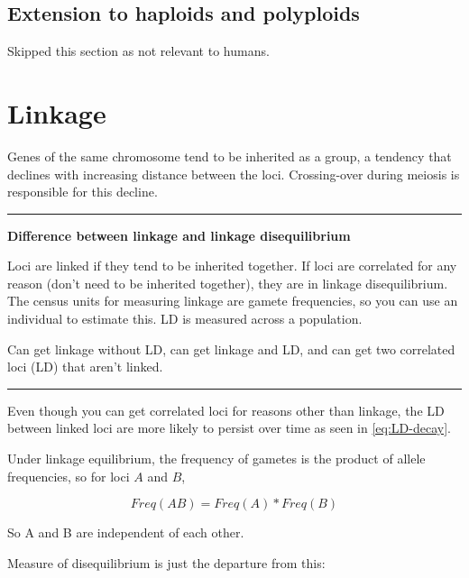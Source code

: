 \documentclass[
]{book}
\begin{document}
\hypertarget{extension-to-haploids-and-polyploids}{%
\subsection{Extension to haploids and polyploids}\label{extension-to-haploids-and-polyploids}}

Skipped this section as not relevant to humans.

\hypertarget{linkage}{%
\section{Linkage}\label{linkage}}

Genes of the same chromosome tend to be inherited as a group, a tendency that declines with increasing distance between the loci. Crossing-over during meiosis is responsible for this decline.

\begin{center}\rule{0.5\linewidth}{0.5pt}\end{center}

\textbf{Difference between linkage and linkage disequilibrium}

Loci are linked if they tend to be inherited together. If loci are correlated for any reason (don't need to be inherited together), they are in linkage disequilibrium. The census units for measuring linkage are gamete frequencies, so you can use an individual to estimate this. LD is measured across a population.

Can get linkage without LD, can get linkage and LD, and can get two correlated loci (LD) that aren't linked.

\begin{center}\rule{0.5\linewidth}{0.5pt}\end{center}

Even though you can get correlated loci for reasons other than linkage, the LD between linked loci are more likely to persist over time as seen in \eqref{eq:LD-decay}.

Under linkage equilibrium, the frequency of gametes is the product of allele frequencies, so for loci \(A\) and \(B\),

\begin{equation}
  Freq(AB) = Freq(A) * Freq(B)
  \label{eq:linkage-equilibrium}
\end{equation}

So A and B are independent of each other.

Measure of disequilibrium is just the departure from this:
\end{document}
